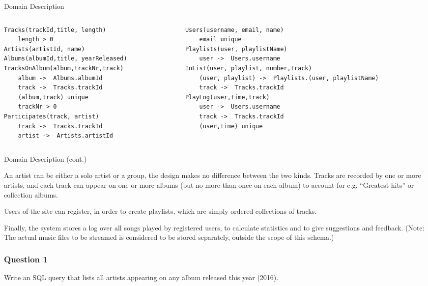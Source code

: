 \documentclass{beamer}
\begin{document}
\begin{frame}[fragile]{Domain Description}
  \footnotesize
\begin{columns}
\begin{column}{0.5\textwidth}
\begin{verbatim}
Tracks(trackId,title, length)
    length > 0
Artists(artistId, name)
Albums(albumId,title, yearReleased)
TracksOnAlbum(album,trackNr,track)
    album ->  Albums.albumId
    track ->  Tracks.trackId
    (album,track) unique
    trackNr > 0
Participates(track, artist)
    track ->  Tracks.trackId
    artist ->  Artists.artistId
\end{verbatim}
  \end{column}
  \begin{column}{0.5\textwidth}  %
\begin{verbatim}
Users(username, email, name)
    email unique
Playlists(user, playlistName)
    user ->  Users.username
InList(user, playlist, number,track)
    (user, playlist) ->  Playlists.(user, playlistName)
    track ->  Tracks.trackId
PlayLog(user,time,track)
    user ->  Users.username
    track ->  Tracks.trackId
    (user,time) unique
\end{verbatim}
  \end{column}
\end{columns}
\end{frame}

\begin{frame}{Domain Description (cont.)}

An artist can be either a solo artist or a group, the design makes no
difference between the two kinds. Tracks are recorded by one or more artists,
and each track can appear on one or more albums (but no more than once on each
album) to account for e.g. ``Greatest hits'' or collection albums.

Users of the site can register, in order to create playlists, which are simply
ordered collections of tracks.

Finally, the system stores a log over all songs played by registered users, to
calculate statistics and to give suggestions and feedback.  (Note: The actual
music files to be streamed is considered to be stored separately, outside the
scope of this schema.)
\end{frame}

\begin{frame}
  \frametitle{Question 1}
  Write an SQL query that lists all artists appearing on any album released this
  year (2016).
\end{frame}
\end{document}
